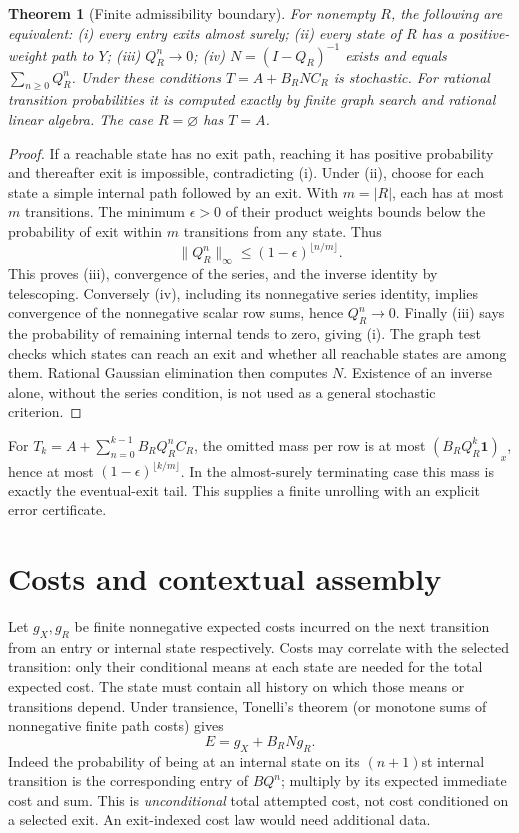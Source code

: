 \documentclass[11pt]{article}
\newtheorem{theorem}{Theorem}\newtheorem{proposition}{Proposition}
\begin{document}
\begin{theorem}[Finite admissibility boundary]
For nonempty $R$, the following are equivalent: (i) every entry exits almost surely; (ii) every state of $R$ has a positive-weight path to $Y$; (iii) $Q_R^n\to0$; (iv) $N=(I-Q_R)^{-1}$ exists and equals $\sum_{n\geq0}Q_R^n$. Under these conditions $T=A+B_RNC_R$ is stochastic. For rational transition probabilities it is computed exactly by finite graph search and rational linear algebra. The case $R=\varnothing$ has $T=A$.
\end{theorem}
\begin{proof}
If a reachable state has no exit path, reaching it has positive probability and thereafter exit is impossible, contradicting (i). Under (ii), choose for each state a simple internal path followed by an exit. With $m=|R|$, each has at most $m$ transitions. The minimum $\epsilon>0$ of their product weights bounds below the probability of exit within $m$ transitions from any state. Thus
\[\|Q_R^n\|_\infty\leq(1-\epsilon)^{\lfloor n/m\rfloor}.
\]
This proves (iii), convergence of the series, and the inverse identity by telescoping. Conversely (iv), including its nonnegative series identity, implies convergence of the nonnegative scalar row sums, hence $Q_R^n\to0$. Finally (iii) says the probability of remaining internal tends to zero, giving (i). The graph test checks which states can reach an exit and whether all reachable states are among them. Rational Gaussian elimination then computes $N$. Existence of an inverse alone, without the series condition, is not used as a general stochastic criterion.
\end{proof}
For $T_k=A+\sum_{n=0}^{k-1}B_RQ_R^nC_R$, the omitted mass per row is at most $(B_RQ_R^k\mathbf1)_x$, hence at most $(1-\epsilon)^{\lfloor k/m\rfloor}$. In the almost-surely terminating case this mass is exactly the eventual-exit tail. This supplies a finite unrolling with an explicit error certificate.

\section{Costs and contextual assembly}
Let $g_X,g_R$ be finite nonnegative expected costs incurred on the next transition from an entry or internal state respectively. Costs may correlate with the selected transition: only their conditional means at each state are needed for the total expected cost. The state must contain all history on which those means or transitions depend. Under transience, Tonelli's theorem (or monotone sums of nonnegative finite path costs) gives
\[E=g_X+B_RNg_R.\tag{2}\]
Indeed the probability of being at an internal state on its $(n+1)$st internal transition is the corresponding entry of $BQ^n$; multiply by its expected immediate cost and sum. This is \emph{unconditional} total attempted cost, not cost conditioned on a selected exit. An exit-indexed cost law would need additional data.
\end{document}
